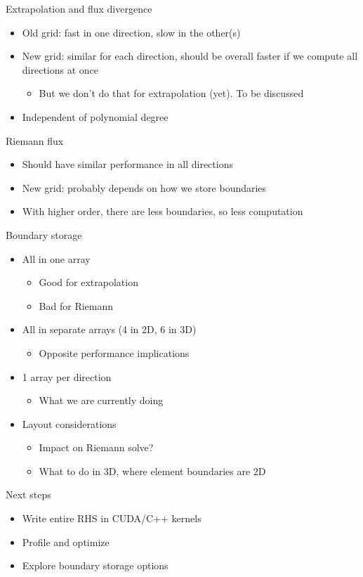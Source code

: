 \documentclass{beamer}
\begin{document}
\begin{frame}{Extrapolation and flux divergence}
\begin{itemize}
    \item Old grid: fast in one direction, slow in the other(s)
    \item New grid: similar for each direction, should be overall faster if we compute all directions at once
        \begin{itemize} \item But we don't do that for extrapolation (yet). To be discussed \end{itemize}
    \item Independent of polynomial degree
\end{itemize}
\end{frame}

\begin{frame}{Riemann flux}
\begin{itemize}
    \item Should have similar performance in all directions
    \item New grid: probably depends on how we store boundaries
    \item With higher order, there are less boundaries, so less computation
\end{itemize}
\end{frame}

\begin{frame}{Boundary storage}
\begin{itemize}
    \item All in one array
    \begin{itemize}
        \item Good for extrapolation
        \item Bad for Riemann
    \end{itemize}
    \item All in separate arrays (4 in 2D, 6 in 3D)
        \begin{itemize} \item Opposite performance implications \end{itemize}
    \item 1 array per direction
        \begin{itemize} \item What we are currently doing \end{itemize}
    \item Layout considerations
    \begin{itemize}
        \item Impact on Riemann solve?
        \item What to do in 3D, where element boundaries are 2D
    \end{itemize}
\end{itemize}
\end{frame}

\begin{frame}{Next steps}
\begin{itemize}
    \item Write entire RHS in CUDA/C++ kernels
    \item Profile and optimize
    \item Explore boundary storage options
\end{itemize}
\end{frame}
\end{document}
